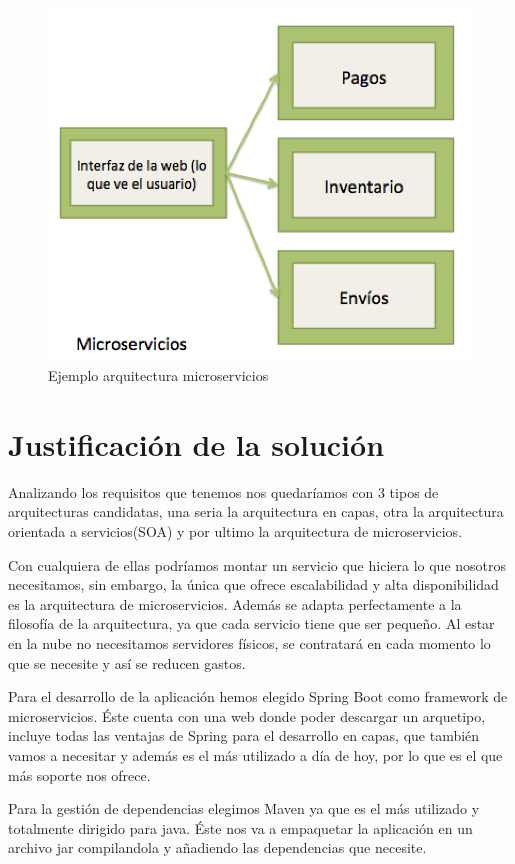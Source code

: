 \documentclass[12pt]{report} %
\begin{document}
\begin{figure}
	\centering
	\includegraphics[width=0.7\linewidth]{imagenes/microservices}
	\caption{Ejemplo arquitectura microservicios}
	\label{fig:microservicesGrafic}
\end{figure}


\chapter{Justificación de la solución}

Analizando los requisitos que tenemos nos quedaríamos con 3 tipos de arquitecturas candidatas, una seria la arquitectura en capas, otra la arquitectura orientada a servicios(SOA) y por ultimo la arquitectura de microservicios. 

Con cualquiera de ellas podríamos montar un servicio que hiciera lo que nosotros necesitamos, sin embargo, la única que ofrece escalabilidad y alta disponibilidad es la arquitectura de microservicios. Además se adapta perfectamente a la filosofía de la arquitectura, ya que cada servicio tiene que ser pequeño. Al estar en la nube no necesitamos servidores físicos, se contratará en cada momento lo que se necesite y así se reducen gastos.

Para el desarrollo de la aplicación hemos elegido Spring Boot como framework de microservicios. Éste cuenta con una web donde poder descargar un arquetipo, incluye todas las ventajas de Spring para el desarrollo en capas, que también vamos a necesitar y además es el más utilizado a día de hoy, por lo que es el que más soporte nos ofrece.

Para la gestión de dependencias elegimos Maven ya que es el más utilizado y totalmente dirigido para java. Éste nos va a empaquetar la aplicación en un archivo jar compilandola y añadiendo las dependencias que necesite.
\end{document}
